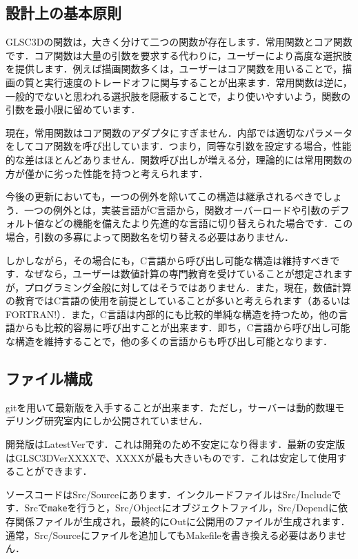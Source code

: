 \documentclass[platex,a4paper,12pt]{jsarticle}%
\begin{document}
\subsection{設計上の基本原則}
GLSC3Dの関数は，大きく分けて二つの関数が存在します．常用関数とコア関数です．コア関数は大量の引数を要求する代わりに，ユーザーにより高度な選択肢を提供します．例えば描画関数多くは，ユーザーはコア関数を用いることで，描画の質と実行速度のトレードオフに関与することが出来ます．常用関数は逆に，一般的でないと思われる選択肢を隠蔽することで，より使いやすいよう，関数の引数を最小限に留めています．

現在，常用関数はコア関数のアダプタにすぎません．内部では適切なパラメータをしてコア関数を呼び出しています．つまり，同等な引数を設定する場合，性能的な差はほとんどありません．関数呼び出しが増える分，理論的には常用関数の方が僅かに劣った性能を持つと考えられます．

今後の更新においても，一つの例外を除いてこの構造は継承されるべきでしょう．一つの例外とは，実装言語がC言語から，関数オーバーロードや引数のデフォルト値などの機能を備えたより先進的な言語に切り替えられた場合です．この場合，引数の多寡によって関数名を切り替える必要はありません．

しかしながら，その場合にも，C言語から呼び出し可能な構造は維持すべきです．なぜなら，ユーザーは数値計算の専門教育を受けていることが想定されますが，プログラミング全般に対してはそうではありません．また，現在，数値計算の教育ではC言語の使用を前提としていることが多いと考えられます（あるいはFORTRAN!）．また，C言語は内部的にも比較的単純な構造を持つため，他の言語からも比較的容易に呼び出すことが出来ます．即ち，C言語から呼び出し可能な構造を維持することで，他の多くの言語からも呼び出し可能となります．


\subsection{ファイル構成}
gitを用いて最新版を入手することが出来ます．ただし，サーバーは動的数理モデリング研究室内にしか公開されていません．

開発版はLatestVerです．これは開発のため不安定になり得ます．最新の安定版はGLSC3DVerXXXXで、XXXXが最も大きいものです．これは安定して使用することができます．

ソースコードはSrc/Sourceにあります．インクルードファイルはSrc/Includeです．Srcで\verb|make|を行うと，Src/Objectにオブジェクトファイル，Src/Dependに依存関係ファイルが生成され，最終的にOutに公開用のファイルが生成されます．通常，Src/Sourceにファイルを追加してもMakefileを書き換える必要はありません．
\end{document}
